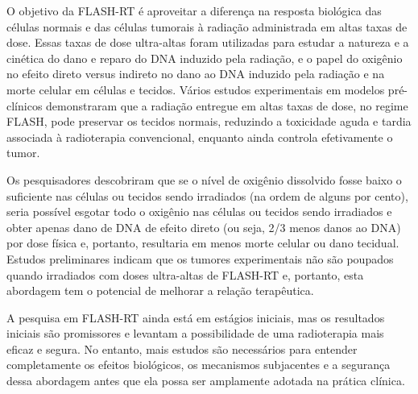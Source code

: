 \documentclass[11pt,a4paper]{article}
\begin{document}
	O objetivo da FLASH-RT é aproveitar a diferença na resposta biológica das células normais e das células tumorais à radiação administrada em altas taxas de dose. Essas taxas de dose ultra-altas foram utilizadas para estudar a natureza e a cinética do dano e reparo do DNA induzido pela radiação, e o papel do oxigênio no efeito direto versus indireto no dano ao DNA induzido pela radiação e na morte celular em células e tecidos. Vários estudos experimentais em modelos pré-clínicos demonstraram que a radiação entregue em altas taxas de dose, no regime FLASH, pode preservar os tecidos normais, reduzindo a toxicidade aguda e tardia associada à radioterapia convencional, enquanto ainda controla efetivamente o tumor. 

	Os pesquisadores descobriram que se o nível de oxigênio dissolvido fosse baixo o suficiente nas células ou tecidos sendo irradiados (na ordem de alguns por cento), seria possível esgotar todo o oxigênio nas células ou tecidos sendo irradiados e obter apenas dano de DNA de efeito direto (ou seja, 2/3 menos danos ao DNA) por dose física e, portanto, resultaria em menos morte celular ou dano tecidual. Estudos preliminares indicam que os tumores experimentais não são poupados quando irradiados com doses ultra-altas de FLASH-RT e, portanto, esta abordagem tem o potencial de melhorar a relação terapêutica.
	
	A pesquisa em FLASH-RT ainda está em estágios iniciais, mas os resultados iniciais são promissores e levantam a possibilidade de uma radioterapia mais eficaz e segura. No entanto, mais estudos são necessários para entender completamente os efeitos biológicos, os mecanismos subjacentes e a segurança dessa abordagem antes que ela possa ser amplamente adotada na prática clínica.
	

\end{document}
